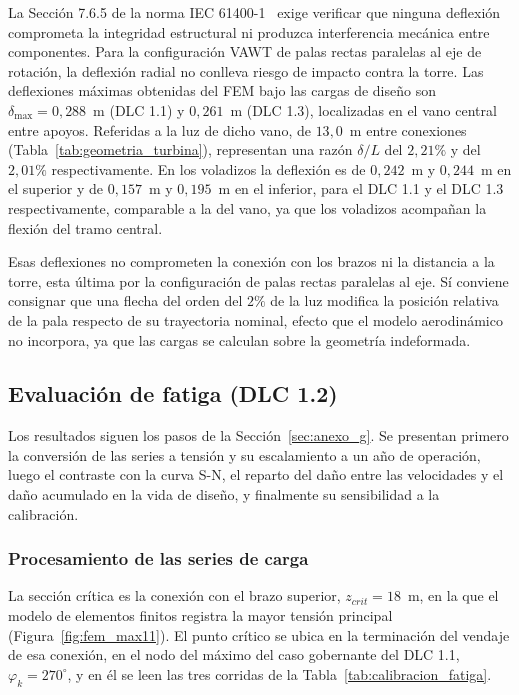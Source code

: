 La Sección 7.6.5 de la norma IEC 61400-1~\parencite*{IEC61400-1} exige verificar que ninguna deflexión comprometa la integridad estructural ni produzca interferencia mecánica entre componentes. Para la configuración VAWT de palas rectas paralelas al eje de rotación, la deflexión radial no conlleva riesgo de impacto contra la torre. Las deflexiones máximas obtenidas del FEM bajo las cargas de diseño son $\delta_{\max} = 0{,}288$~m (DLC 1.1) y $0{,}261$~m (DLC 1.3), localizadas en el vano central entre apoyos. Referidas a la luz de dicho vano, de $13{,}0$~m entre conexiones (Tabla~\ref{tab:geometria_turbina}), representan una razón $\delta/L$ del $2{,}21\%$ y del $2{,}01\%$ respectivamente. En los voladizos la deflexión es de $0{,}242$~m y $0{,}244$~m en el superior y de $0{,}157$~m y $0{,}195$~m en el inferior, para el DLC 1.1 y el DLC 1.3 respectivamente, comparable a la del vano, ya que los voladizos acompañan la flexión del tramo central.

Esas deflexiones no comprometen la conexión con los brazos ni la distancia a la torre, esta última por la configuración de palas rectas paralelas al eje. Sí conviene consignar que una flecha del orden del $2\%$ de la luz modifica la posición relativa de la pala respecto de su trayectoria nominal, efecto que el modelo aerodinámico no incorpora, ya que las cargas se calculan sobre la geometría indeformada.

\subsection{Evaluación de fatiga (DLC 1.2)}
\label{sec:resultados_fatiga}

Los resultados siguen los pasos de la Sección~\ref{sec:anexo_g}. Se presentan primero la conversión de las series a tensión y su escalamiento a un año de operación, luego el contraste con la curva S-N, el reparto del daño entre las velocidades y el daño acumulado en la vida de diseño, y finalmente su sensibilidad a la calibración.

\subsubsection{Procesamiento de las series de carga}

La sección crítica es la conexión con el brazo superior, $z_{crit} = 18$~m, en la que el modelo de elementos finitos registra la mayor tensión principal (Figura~\ref{fig:fem_max11}). El punto crítico se ubica en la terminación del vendaje de esa conexión, en el nodo del máximo del caso gobernante del DLC 1.1, $\varphi_k = 270^\circ$, y en él se leen las tres corridas de la Tabla~\ref{tab:calibracion_fatiga}.


